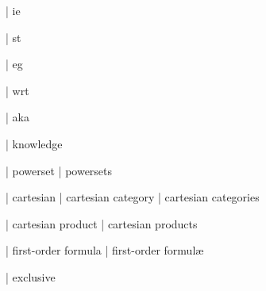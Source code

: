 
  | ie

  | st

  | eg

  | wrt

  | aka


  | knowledge

  | powerset
  | powersets


  | cartesian
  | cartesian category
  | cartesian categories

  | cartesian product
  | cartesian products

  | first-order formula
  | first-order formul\ae{}

  | exclusive

